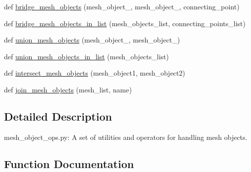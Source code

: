 \begin{DoxyCompactItemize}
\item 
def \hyperlink{namespacemeshy_1_1neuromorphovis_1_1mesh_1_1ops_1_1mesh__object__ops_a2d866ad43ae9da1c684e7311680e58a7}{bridge\+\_\+mesh\+\_\+objects} (mesh\+\_\+object\+\_, mesh\+\_\+object\+\_, connecting\+\_\+point)
\item 
def \hyperlink{namespacemeshy_1_1neuromorphovis_1_1mesh_1_1ops_1_1mesh__object__ops_a4ca8463c4fbe256a4f69dc58d36460d6}{bridge\+\_\+mesh\+\_\+objects\+\_\+in\+\_\+list} (mesh\+\_\+objects\+\_\+list, connecting\+\_\+points\+\_\+list)
\item 
def \hyperlink{namespacemeshy_1_1neuromorphovis_1_1mesh_1_1ops_1_1mesh__object__ops_af8f012f18baf31008f2fcab3d2fcaf0b}{union\+\_\+mesh\+\_\+objects} (mesh\+\_\+object\+\_, mesh\+\_\+object\+\_)
\item 
def \hyperlink{namespacemeshy_1_1neuromorphovis_1_1mesh_1_1ops_1_1mesh__object__ops_a08f50cce663245479c0a5f910d971ecc}{union\+\_\+mesh\+\_\+objects\+\_\+in\+\_\+list} (mesh\+\_\+objects\+\_\+list)
\item 
def \hyperlink{namespacemeshy_1_1neuromorphovis_1_1mesh_1_1ops_1_1mesh__object__ops_af189d3df0473f28c73e51cf0baeae00d}{intersect\+\_\+mesh\+\_\+objects} (mesh\+\_\+object1, mesh\+\_\+object2)
\item 
def \hyperlink{namespacemeshy_1_1neuromorphovis_1_1mesh_1_1ops_1_1mesh__object__ops_a22f71ef20288e1fd4aa9435c4337bf7d}{join\+\_\+mesh\+\_\+objects} (mesh\+\_\+list, name)
\end{DoxyCompactItemize}


\subsection{Detailed Description}
\begin{DoxyVerb}mesh_object_ops.py:
A set of utilities and operators for handling mesh objects.
\end{DoxyVerb}
 

\subsection{Function Documentation}
